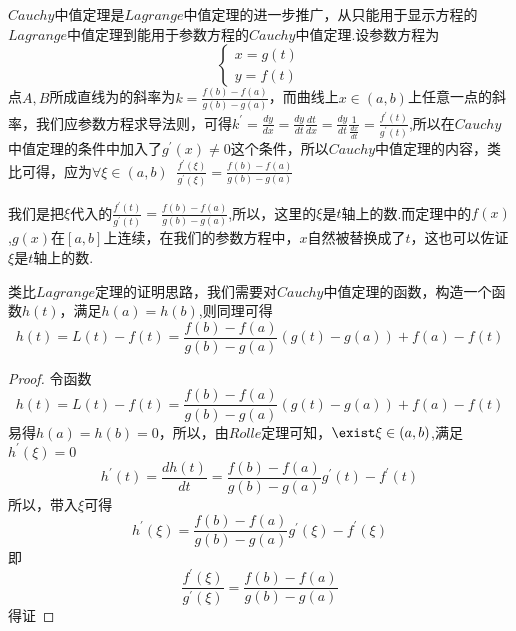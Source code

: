 \documentclass[12pt, a4paper, oneside]{ctexart}
\begin{document}
\begin{note}
$Cauchy$中值定理是$Lagrange$中值定理的进一步推广，从只能用于显示方程的$Lagrange$中值定理到能用于参数方程的$Cauchy$中值定理.设参数方程为
\begin{equation}
    \begin{cases}
    x=g(t)\\
    y=f(t)
    \end{cases}
\end{equation}
点$A,B$所成直线为的斜率为$k=\frac{f(b)-f(a)}{g(b)-g(a)}$，而曲线上$x\in(a,b)$上任意一点的斜率，我们应参数方程求导法则，可得$k^{'}=\frac{dy}{dx}=\frac{dy}{dt}\frac{dt}{dx}=\frac{dy}{dt}\frac{1}{\frac{dx}{dt}}=\frac{f^{'}(t)}{g^{'}(t)}$,所以在$Cauchy$中值定理的条件中加入了$g^{'}(x)\neq 0$这个条件，所以$Cauchy$中值定理的内容，类比可得，应为$\forall \xi \in (a,b)\;\;\frac{f^{'}(\xi)}{g^{'}(\xi)}=\frac{f(b)-f(a)}{g(b)-g(a)}$
\end{note}

\begin{note}
我们是把$\xi$代入的$\frac{f^{'}(t)}{g^{'}(t)}=\frac{f(b)-f(a)}{g(b)-g(a)}$,所以，这里的$\xi$是$t$轴上的数.而定理中的$f(x)$,$g(x)$在$[a,b]$上连续，在我们的参数方程中，$x$自然被替换成了$t$，这也可以佐证$\xi$是$t$轴上的数.
\end{note}

\begin{note}
类比$Lagrange$定理的证明思路，我们需要对$Cauchy$中值定理的函数，构造一个函数$h(t)$，满足$h(a)=h(b)$,则同理可得
\begin{equation}
    h(t)=L(t)-f(t)=\frac{f(b)-f(a)}{g(b)-g(a)}(g(t)-g(a))+f(a)-f(t)
\end{equation}
\end{note}

\begin{proof}
令函数
\begin{equation}
    h(t)=L(t)-f(t)=\frac{f(b)-f(a)}{g(b)-g(a)}(g(t)-g(a))+f(a)-f(t)
\end{equation}
易得$h(a)=h(b)=0$，所以，由$Rolle$定理可知，$\exist \xi \in (a,b)$,满足$h^{'}(\xi)=0$
\begin{equation}
    h^{'}(t)=\frac{dh(t)}{dt}=\frac{f(b)-f(a)}{g(b)-g(a)}g^{'}(t)-f^{'}(t)
\end{equation}
所以，带入$\xi$可得
\begin{equation}
     h^{'}(\xi)=\frac{f(b)-f(a)}{g(b)-g(a)}g^{'}(\xi)-f^{'}(\xi)
\end{equation}
即
\begin{equation}
     \frac{f^{'}(\xi)}{g^{'}(\xi)}=\frac{f(b)-f(a)}{g(b)-g(a)}
\end{equation}
得证
\end{proof}
\end{document}
